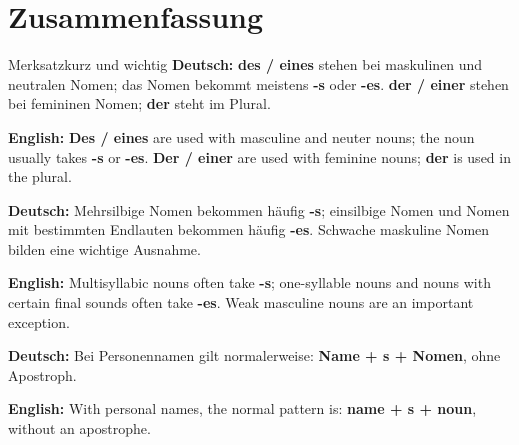 \documentclass[a4paper,11pt]{article}
\newcommand{\GermanText}[1]{\textbf{Deutsch: }#1\par}
\newcommand{\EnglishText}[1]{{\small\color{SoftGray}\textbf{English: }#1\par}}
\begin{document}
    \section{Zusammenfassung}

        \begin{grammarentry}{Merksatz}{kurz und wichtig}
            \GermanText{\textbf{des / eines} stehen bei maskulinen und neutralen Nomen; das Nomen bekommt meistens \textbf{-s} oder \textbf{-es}. \textbf{der / einer} stehen bei femininen Nomen; \textbf{der} steht im Plural.}
            \EnglishText{\textbf{Des / eines} are used with masculine and neuter nouns; the noun usually takes \textbf{-s} or \textbf{-es}. \textbf{Der / einer} are used with feminine nouns; \textbf{der} is used in the plural.}

            \GermanText{Mehrsilbige Nomen bekommen häufig \textbf{-s}; einsilbige Nomen und Nomen mit bestimmten Endlauten bekommen häufig \textbf{-es}. Schwache maskuline Nomen bilden eine wichtige Ausnahme.}
            \EnglishText{Multisyllabic nouns often take \textbf{-s}; one-syllable nouns and nouns with certain final sounds often take \textbf{-es}. Weak masculine nouns are an important exception.}

            \GermanText{Bei Personennamen gilt normalerweise: \textbf{Name + s + Nomen}, ohne Apostroph.}
            \EnglishText{With personal names, the normal pattern is: \textbf{name + s + noun}, without an apostrophe.}
        \end{grammarentry}
\end{document}
